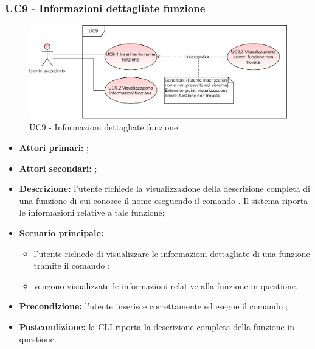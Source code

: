 \subsubsection{UC9 - Informazioni dettagliate funzione}
\begin{figure}[h]
	\centering
	\includegraphics[scale=\ucs]{./res/img/UC9.png}
	\caption {UC9 - Informazioni dettagliate funzione}
\end{figure}
\begin{itemize}
	\item \textbf{Attori primari:} \ua{};
	\item \textbf{Attori secondari:} \re{};
	\item \textbf{Descrizione:} l’utente richiede la visualizzazione della descrizione completa di una funzione di cui conosce il nome eseguendo il comando \pinfo{}. Il sistema riporta le informazioni relative a tale funzione;
	\item \textbf{Scenario principale:} 
	\begin{itemize}
		\item l'utente richiede di visualizzare le informazioni dettagliate di una funzione tramite il comando \pinfo{}; 
		\item vengono visualizzate le informazioni relative alla funzione in questione.
	\end{itemize}
	\item \textbf{Precondizione:} l'utente inserisce correttamente ed esegue il comando \pinfo{};
	\item \textbf{Postcondizione:} la CLI riporta la descrizione completa della funzione in questione.
\end{itemize}